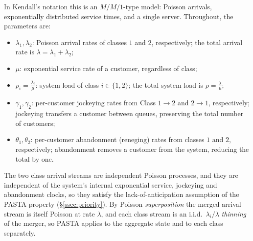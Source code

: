 In Kendall's notation this is an $M/M/1$-type model: Poisson arrivals, exponentially distributed service times, and a single server. Throughout, the parameters are:
\begin{itemize}
    \item $\lambda_1, \lambda_2$: Poisson arrival rates of classes $1$ and $2$, respectively; the total arrival rate is $\lambda=\lambda_1+\lambda_2$;
    \item $\mu$: exponential service rate of a customer, regardless of class;
    \item $\rho_i = \frac{\lambda_i}{\mu}$: system load of class $i \in \{1,2\}$; the total system load is $\rho=\frac{\lambda}{\mu}$;
    \item $\gamma_1, \gamma_2$: per-customer jockeying rates from Class $1\to2$ and $2\to1$, respectively; jockeying transfers a customer between queues, preserving the total number of customers;
    \item $\theta_1, \theta_2$: per-customer abandonment (reneging) rates from classes $1$ and $2$, respectively; abandonment removes a customer from the system, reducing the total by one.
\end{itemize}
The two class arrival streams are independent Poisson processes, and they are independent of the system's internal exponential service, jockeying and abandonment clocks, so they satisfy the lack-of-anticipation assumption of the PASTA property (\S\ref{ssec:priority}). By Poisson \emph{superposition} the merged arrival stream is itself Poisson at rate $\lambda$, and each class stream is an i.i.d.\ $\lambda_i/\lambda$ \emph{thinning} of the merger, so PASTA applies to the aggregate state and to each class separately.

